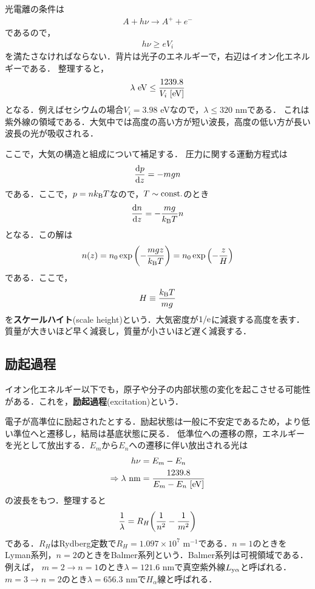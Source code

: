 \documentclass{report}
\begin{document}
      光電離の条件は
      \begin{align}
        A + h\nu \rightarrow A^+ + e^-
      \end{align}
      であるので，
      \begin{align}
        h\nu \geq e V_i
      \end{align}
      を満たさなければならない．背片は光子のエネルギーで，右辺はイオン化エネルギーである．
      整理すると，
      \begin{align}
        \lambda\ \mathrm{eV} \leq \frac{1239.8}{V_i\ [\mathrm{eV}]}
      \end{align}
      となる．例えばセシウムの場合$V_i = 3.98$ eVなので，$\lambda \leq 320$ nmである．
      これは紫外線の領域である．大気中では高度の高い方が短い波長，高度の低い方が長い波長の光が吸収される．

      ここで，大気の構造と組成について補足する．
      圧力に関する運動方程式は
      \begin{align}
        \dv{p}{z} = -mgn
      \end{align}
      である．ここで，$p=nk_{\mathrm{B}} T$なので，$T \sim \mathrm{const.}$のとき
      \begin{align}
        \dv{n}{z} = - \frac{mg}{k_{\mathrm{B}} T}n
      \end{align}
      となる．この解は
      \begin{align}
        n(z) = n_0 \exp\qty(-\frac{mgz}{k_{\mathrm{B}} T}) = n_0 \exp\qty(-\frac{z}{H})
      \end{align}
      である．ここで，
      \begin{align}
        H \equiv \frac{k_{\mathrm{B}} T}{mg}
      \end{align}
      を\textbf{スケールハイト}(scale height)という．大気密度が$1/\mathrm{e}$に減衰する高度を表す．
      質量が大きいほど早く減衰し，質量が小さいほど遅く減衰する．

      \subsection{励起過程}
      イオン化エネルギー以下でも，原子や分子の内部状態の変化を起こさせる可能性がある．これを，\textbf{励起過程}(excitation)という．

      電子が高準位に励起されたとする．励起状態は一般に不安定であるため，より低い準位へと遷移し，結局は基底状態に戻る．
      低準位への遷移の際，エネルギーを光として放出する．$E_m$から$E_n$への遷移に伴い放出される光は
      \begin{align}
        h\nu &= E_m - E_n\\
        \Rightarrow \lambda\ \r{nm} &= \frac{1239.8}{E_m - E_n\ [\r{eV}]}
      \end{align}
      の波長をもつ．整理すると
      \begin{align}
        \frac{1}{\lambda} = R_H\qty(\frac{1}{n^2} - \frac{1}{m^2})
      \end{align}
      である．$R_H$はRydberg定数で$R_H = 1.097 \times 10^7$ m$^{-1}$である．$n=1$のときをLyman系列，$n=2$のときをBalmer系列という．Balmer系列は可視領域である．例えば，
      $m=2\to n=1$のとき$\lambda = 121.6$ nmで真空紫外線$L_{\mathrm{y\alpha}}$と呼ばれる．$m=3\to n=2$のとき$\lambda = 656.3$ nmで$H_{\alpha}$線と呼ばれる．
\end{document}
